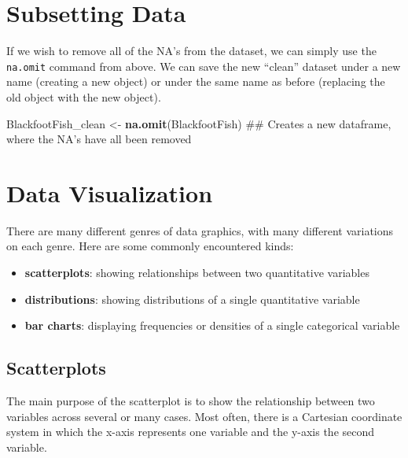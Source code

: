 \documentclass[]{article}
\newenvironment{Shaded}{\begin{snugshade}}{\end{snugshade}}
\newcommand{\KeywordTok}[1]{\textcolor[rgb]{0.13,0.29,0.53}{\textbf{#1}}}
\newcommand{\StringTok}[1]{\textcolor[rgb]{0.31,0.60,0.02}{#1}}
\newcommand{\NormalTok}[1]{#1}
\providecommand{\tightlist}{%
  \setlength{\itemsep}{0pt}\setlength{\parskip}{0pt}}
\begin{document}
\section{Subsetting Data}\label{subsetting-data}

If we wish to remove all of the NA's from the dataset, we can simply use
the \texttt{na.omit} command from above. We can save the new ``clean''
dataset under a new name (creating a new object) or under the same name
as before (replacing the old object with the new object).

\vspace{0.25cm}

\begin{Shaded}
\begin{Highlighting}[]
\NormalTok{BlackfootFish_clean <-}\StringTok{ }\KeywordTok{na.omit}\NormalTok{(BlackfootFish)}
\NormalTok{## Creates a new dataframe, where the NA's have all been removed}
\end{Highlighting}
\end{Shaded}

\vspace{0.25cm}

\section{Data Visualization}\label{data-visualization}

There are many different genres of data graphics, with many different
variations on each genre. Here are some commonly encountered kinds:

\begin{itemize}
\tightlist
\item
  \textbf{scatterplots}: showing relationships between two quantitative
  variables\\
\item
  \textbf{distributions}: showing distributions of a single quantitative
  variable\\
\item
  \textbf{bar charts}: displaying frequencies or densities of a single
  categorical variable
\end{itemize}

\subsection{Scatterplots}\label{scatterplots}

The main purpose of the scatterplot is to show the relationship between
two variables across several or many cases. Most often, there is a
Cartesian coordinate system in which the x-axis represents one variable
and the y-axis the second variable.
\end{document}
